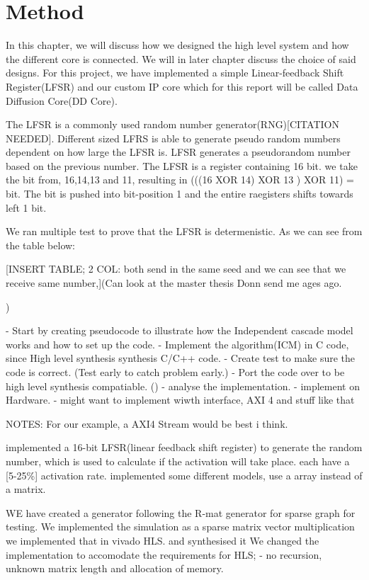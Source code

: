 \chapter{Method} \label{methode}
In this chapter, we will discuss how we designed the high level system and how the different core is connected. We will in later chapter discuss the choice of said designs. For this project, we have implemented a simple Linear-feedback Shift Register(LFSR) and our custom IP core which for this report will be called Data Diffusion Core(DD Core).


The LFSR is a commonly used random number generator(RNG)[CITATION NEEDED]. Different sized LFRS is able to generate pseudo random numbers dependent on how large the LFSR is. LFSR generates a pseudorandom number based on the previous number. The LFSR is a register containing 16 bit. we take the bit from, 16,14,13 and 11, resulting in (((16 XOR 14) XOR 13 ) XOR 11) = bit. The bit is pushed into bit-position 1 and the entire raegisters shifts towards left 1 bit. 

We ran multiple test to prove that the LFSR is determenistic. As we can see from the table below:

[INSERT TABLE; 2 COL: both send in the same seed and we can see that we receive same number,](Can look at the master thesis Donn send me ages ago.

)


- Start by creating pseudocode to illustrate how the Independent cascade model works and how to set up the code.
- Implement the algorithm(ICM) in C code, since High level synthesis synthesis C/C++ code. 
- Create test to make sure the code is correct. (Test early to catch problem early.)
- Port the code over to be high level synthesis compatiable. () 
- analyse the implementation.
- implement on Hardware.
- might want to implement wiwth interface, AXI 4 and stuff like that 


NOTES: 
For our example, a AXI4 Stream would be best i think.

implemented a 16-bit LFSR(linear feedback shift register) to generate the random number, which is used to calculate if the activation will take place.
each have a [5-25\%] activation rate. implemented some different models, use a array instead of a matrix. 

WE have created a generator following the R-mat generator for sparse graph for testing.
We implemented the simulation as a sparse matrix vector multiplication
we implemented that in vivado HLS. and synthesised it
We changed the implementation to accomodate the requirements for HLS; - no recursion, unknown matrix length and allocation of memory. 



